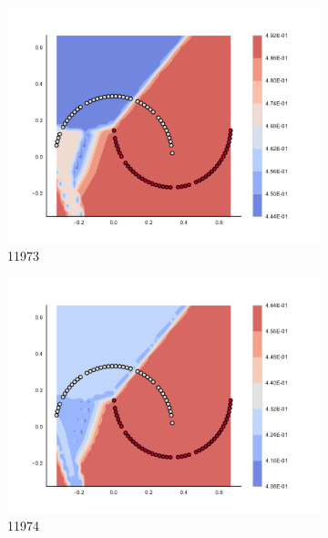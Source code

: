 \begin{figure}[h]
\begin{subfigure}[b]{0.09\textwidth}
    \includegraphics[clip, trim=2.35cm 1.75cm 4.5cm 0cm,width=\textwidth]{img/convergence/11973.pdf}
    \caption{11973}
    \label{fig:convergence_11973}
\end{subfigure}
%
\begin{subfigure}[b]{0.09\textwidth}
    \includegraphics[clip, trim=2.35cm 1.75cm 4.5cm 0cm,width=\textwidth]{img/convergence/11974.pdf}
    \caption{11974}
    \label{fig:convergence_11974}
\end{subfigure}
%
\begin{subfigure}[b]{0.09\textwidth}

\end{subfigure}
\end{figure}

